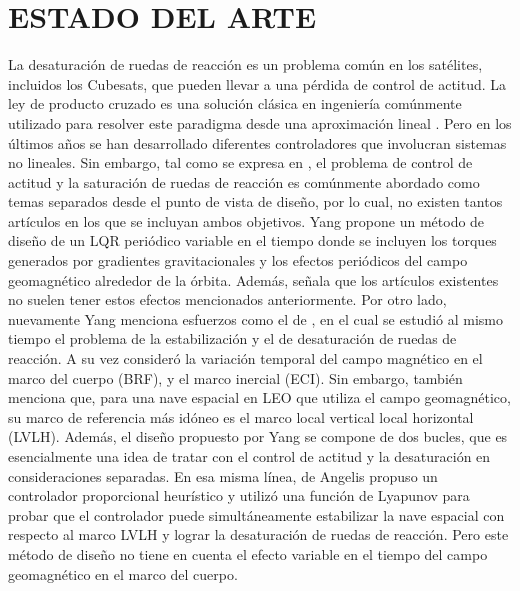 \section{ESTADO DEL ARTE}

La desaturación de ruedas de reacción es un problema común en los satélites, incluidos los Cubesats, que pueden llevar a una pérdida de control de actitud. La ley de producto cruzado es una solución clásica en ingeniería comúnmente utilizado para resolver este paradigma desde una aproximación lineal \cite{Tregouet2015}. Pero en los últimos años se han desarrollado diferentes controladores que involucran sistemas no lineales.
Sin embargo, tal como se expresa en \cite{Yang2017}, el problema de control de actitud y la saturación de ruedas de reacción es comúnmente abordado como temas separados desde el punto de vista de diseño, por lo cual, no existen tantos artículos en los que se incluyan ambos objetivos. Yang\cite{Yang2017} propone un método de diseño de un LQR periódico variable en el tiempo donde se incluyen los torques generados por gradientes gravitacionales y los efectos periódicos del campo geomagnético alrededor de la órbita. Además, señala que los artículos existentes no suelen tener estos efectos mencionados anteriormente.
Por otro lado, nuevamente Yang\cite{Yang2017} menciona esfuerzos como el de \cite{Tregouet2015}, en el cual se estudió al mismo tiempo el problema de la estabilización y el de desaturación de ruedas de reacción. A su vez consideró la variación temporal del campo magnético en el marco del cuerpo (BRF), y el marco inercial (ECI). Sin embargo, también menciona que, para una nave espacial en LEO que utiliza el campo geomagnético, su marco de referencia más idóneo es el marco local vertical local horizontal (LVLH). Además, el diseño propuesto por Yang\cite{Yang2017} se compone de dos bucles, que es esencialmente una idea de tratar con el control de actitud y la desaturación en consideraciones separadas.
En esa misma línea, de Angelis \cite{Angelis2016} propuso un controlador proporcional heurístico y utilizó una función de Lyapunov para probar que el controlador puede simultáneamente estabilizar la nave espacial con respecto al marco LVLH y lograr la desaturación de ruedas de reacción. Pero este método de diseño no tiene en cuenta el efecto variable en el tiempo del campo geomagnético en el marco del cuerpo.

